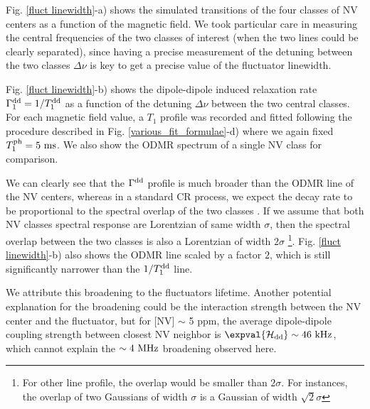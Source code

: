 \documentclass[a4paper,11pt]{report}
\begin{document}
Fig. \ref{fluct linewidth}-a) shows the simulated transitions of the four classes of NV centers as a function of the magnetic field. We took particular care in measuring the central frequencies of the two classes of interest (when the two lines could be clearly separated), since having a precise measurement of the detuning between the two classes $\Delta \nu$ is key to get a precise value of the fluctuator linewidth.

Fig. \ref{fluct linewidth}-b) shows the dipole-dipole induced relaxation rate $\Gamma_1^{\rm dd}=1/T_1^{\rm dd}$ as a function of the detuning $\Delta \nu$ between the two central classes. For each magnetic field value, a $T_1$ profile was recorded and fitted following the procedure described in Fig. \ref{various_fit_formulae}-d) where we again fixed $T_1^{\rm ph}=5\ \rm ms$. We also show the ODMR spectrum of a single NV class for comparison.

We can clearly see that the $\Gamma^{\rm dd}$ profile is much broader than the ODMR line of the NV centers, whereas in a standard CR process, we expect the decay rate to be proportional to the spectral overlap of the two classes \citep{hall2016detection}. If we assume that both NV classes spectral response are Lorentzian of same width $\sigma$, then the spectral overlap between the two classes is also a Lorentzian of width $2 \sigma$ \footnote{For other line profile, the overlap would be smaller than $2 \sigma$. For instances, the overlap of two Gaussians of width $\sigma$ is a Gaussian of width $\sqrt{2} \sigma$}. Fig. \ref{fluct linewidth}-b) also shows the ODMR line scaled by a factor $2$, which is still significantly narrower than the $1/T_1^{\rm dd}$ line.

We attribute this broadening to the fluctuators lifetime. Another potential explanation for the broadening could be the interaction strength between the NV center and the fluctuator, but for [NV] $\sim$ 5 ppm, the average dipole-dipole coupling strength between closest NV neighbor is $\expval{\mathcal{H}_{\rm dd}} \sim 46\ \rm kHz$, which cannot explain the $\sim 4\ \rm MHz$ broadening observed here.
\end{document}
